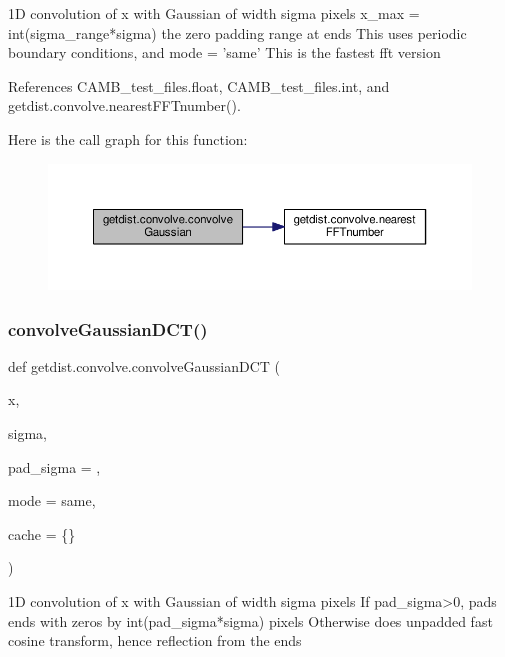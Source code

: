 \begin{DoxyVerb}1D convolution of x with Gaussian of width sigma pixels
x_max = int(sigma_range*sigma) the zero padding range at ends
This uses periodic boundary conditions, and mode = 'same'
This is the fastest fft version
\end{DoxyVerb}
 

References C\+A\+M\+B\+\_\+test\+\_\+files.\+float, C\+A\+M\+B\+\_\+test\+\_\+files.\+int, and getdist.\+convolve.\+nearest\+F\+F\+Tnumber().

Here is the call graph for this function\+:
\nopagebreak
\begin{figure}[H]
\begin{center}
\leavevmode
\includegraphics[width=350pt]{namespacegetdist_1_1convolve_ab80d0e9a346922b403393e83be18b56e_cgraph}
\end{center}
\end{figure}
\mbox{\label{namespacegetdist_1_1convolve_acf5c938da0fecbf932f13c93050fd706}} 
\subsubsection{\texorpdfstring{convolve\+Gaussian\+D\+C\+T()}{convolveGaussianDCT()}}
{\footnotesize\ttfamily def getdist.\+convolve.\+convolve\+Gaussian\+D\+CT (\begin{DoxyParamCaption}\item[{}]{x,  }\item[{}]{sigma,  }\item[{}]{pad\+\_\+sigma = {},  }\item[{}]{mode = {\ttfamily \textquotesingle{}same\textquotesingle{}},  }\item[{}]{cache = {\ttfamily \{\}} }\end{DoxyParamCaption})}

\begin{DoxyVerb}1D convolution of x with Gaussian of width sigma pixels
If pad_sigma>0, pads ends with zeros by int(pad_sigma*sigma) pixels
Otherwise does unpadded fast cosine transform, hence reflection from the ends
\end{DoxyVerb}
 

